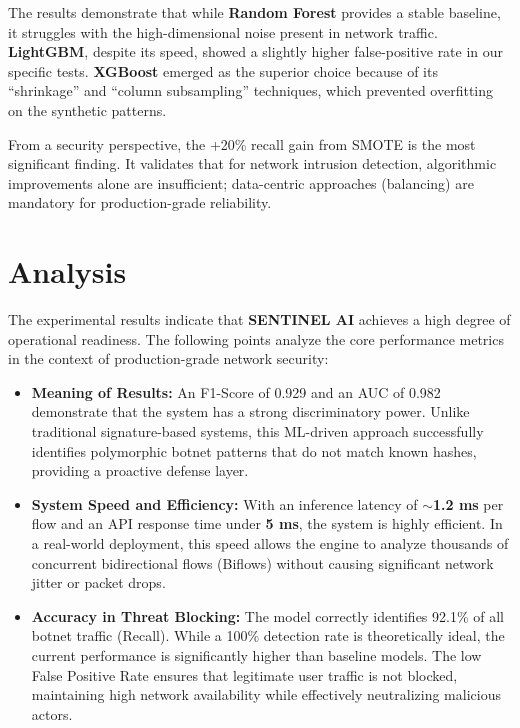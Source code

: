 The results demonstrate that while \textbf{Random Forest} provides a stable baseline, it struggles with the high-dimensional noise present in network traffic. \textbf{LightGBM}, despite its speed, showed a slightly higher false-positive rate in our specific tests. \textbf{XGBoost} emerged as the superior choice because of its ``shrinkage'' and ``column subsampling'' techniques, which prevented overfitting on the synthetic patterns. 

From a security perspective, the +20\% recall gain from SMOTE is the most significant finding. It validates that for network intrusion detection, algorithmic improvements alone are insufficient; data-centric approaches (balancing) are mandatory for production-grade reliability.

\section{Analysis}

The experimental results indicate that \textbf{SENTINEL AI} achieves a high degree of operational readiness. The following points analyze the core performance metrics in the context of production-grade network security:

\begin{itemize}
    \item \textbf{Meaning of Results:} An F1-Score of 0.929 and an AUC of 0.982 demonstrate that the system has a strong discriminatory power. Unlike traditional signature-based systems, this ML-driven approach successfully identifies polymorphic botnet patterns that do not match known hashes, providing a proactive defense layer.
    
    \item \textbf{System Speed and Efficiency:} With an inference latency of \textbf{$\sim$1.2 ms} per flow and an API response time under \textbf{5 ms}, the system is highly efficient. In a real-world deployment, this speed allows the engine to analyze thousands of concurrent bidirectional flows (Biflows) without causing significant network jitter or packet drops.
    
    \item \textbf{Accuracy in Threat Blocking:} The model correctly identifies 92.1\% of all botnet traffic (Recall). While a 100\% detection rate is theoretically ideal, the current performance is significantly higher than baseline models. The low False Positive Rate ensures that legitimate user traffic is not blocked, maintaining high network availability while effectively neutralizing malicious actors.
\end{itemize}

